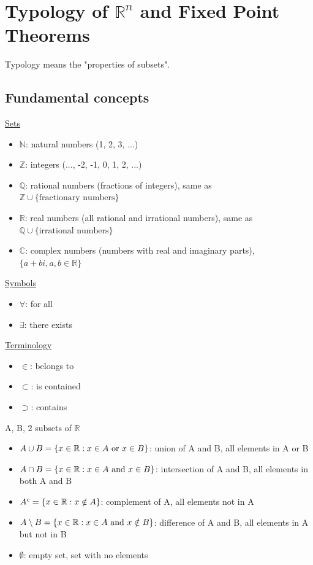 \chapter{Typology of ${\mathbb{R}}^n$ and Fixed Point Theorems}
Typology means the "properties of subsets".

\section{Fundamental concepts}

\underline{Sets}
\begin{itemize}
    \item $\mathbb{N}$: natural numbers (1, 2, 3, ...)
    \item $\mathbb{Z}$: integers (..., -2, -1, 0, 1, 2, ...)
    \item $\mathbb{Q}$: rational numbers (fractions of integers), same as $\mathbb{Z}\cup\{\text{fractionary numbers}\}$
    \item $\mathbb{R}$: real numbers (all rational and irrational numbers), same as $\mathbb{Q}\cup\{\text{irrational numbers}\}$
    \item $\mathbb{C}$: complex numbers (numbers with real and imaginary parts), $\{a+bi, a, b\in\mathbb{R}\}$
\end{itemize}

\noindent
\underline{Symbols}
\begin{itemize}
    \item $\forall$: for all
    \item $\exists$: there exists
\end{itemize}

\noindent
\underline{Terminology}
\begin{itemize}
    \item $\in$: belongs to
    \item $\subset$: is contained
    \item $\supset$: contains
\end{itemize}

\noindent
A, B, 2 subsets of $\mathbb{R}$
\begin{itemize}
    \item $A\cup B = \{x\in\mathbb{R}:x\in A\text{ or }x\in B\}$: union of A and B, all elements in A or B
    \item $A\cap B = \{x\in\mathbb{R}:x\in A\text{ and }x\in B\}$: intersection of A and B, all elements in both A and B
    \item $A^c = \{x\in\mathbb{R}:x\notin A\}$: complement of A, all elements not in A
    \item $A\setminus B = \{x\in\mathbb{R}:x\in A\text{ and }x\notin B\}$: difference of A and B, all elements in A but not in B
    \item $\emptyset$: empty set, set with no elements
\end{itemize}

